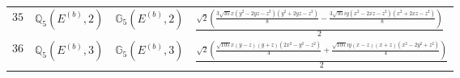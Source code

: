 \documentclass[fleqn,8pt,landscape]{jsarticle}
\begin{document}
\begin{table}[ht!]
\begin{center}
\begin{tabular}{cccl}
$ 35 $ & $ \mathbb{Q}_{5}(E^{(b)},2) $ & $ \mathbb{G}_{5}(E^{(b)},2) $ & $ \frac{\sqrt{2} \left(\frac{3 \sqrt{35} x \left(y^{2} - 2 y z - z^{2}\right) \left(y^{2} + 2 y z - z^{2}\right)}{8} - \frac{3 \sqrt{35} i y \left(x^{2} - 2 x z - z^{2}\right) \left(x^{2} + 2 x z - z^{2}\right)}{8}\right)}{2} $ \\
$ 36 $ & $ \mathbb{Q}_{5}(E^{(b)},3) $ & $ \mathbb{G}_{5}(E^{(b)},3) $ & $ \frac{\sqrt{2} \left(\frac{\sqrt{105} x \left(y - z\right) \left(y + z\right) \left(2 x^{2} - y^{2} - z^{2}\right)}{4} + \frac{\sqrt{105} i y \left(x - z\right) \left(x + z\right) \left(x^{2} - 2 y^{2} + z^{2}\right)}{4}\right)}{2} $ \\
 \hline \hline
\end{tabular}
\end{center}
\end{table}
\end{document}
